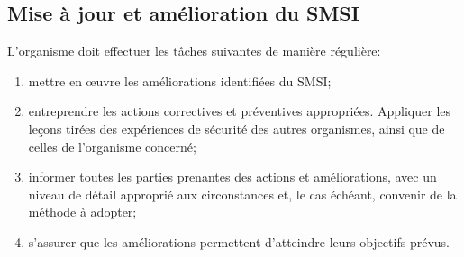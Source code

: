 \subsection{Mise à jour et amélioration du SMSI}

L'organisme doit effectuer les tâches suivantes de manière régulière:

\begin{enumerate}
	\item mettre en œuvre les améliorations identifiées du SMSI;

	\item entreprendre les actions correctives et préventives appropriées. Appliquer les leçons tirées des expériences de sécurité des autres organismes, ainsi que de celles de l'organisme concerné;

	\item informer toutes les parties prenantes des actions et améliorations, avec un niveau de détail approprié aux circonstances et, le cas échéant, convenir de la méthode à adopter;

	\item s'assurer que les améliorations permettent d'atteindre leurs objectifs prévus.
\end{enumerate}



\clearpage

